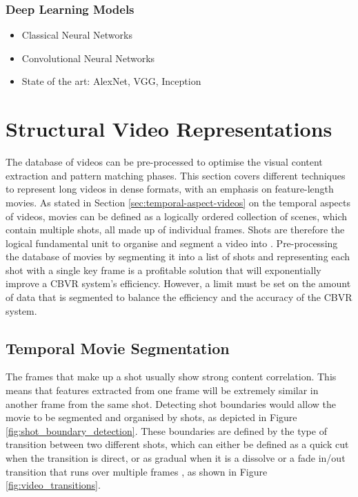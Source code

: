 \subsubsection{Deep Learning Models}

\begin{itemize}
    \item Classical Neural Networks
    \item Convolutional Neural Networks
    \item State of the art: AlexNet, VGG, Inception
\end{itemize}


\section{Structural Video Representations}
\label{sec:movie-pre-processing}

The database of videos can be pre-processed to optimise the visual content extraction and pattern matching phases. This section covers different techniques to represent long videos in dense formats, with an emphasis on feature-length movies. As stated in Section \ref{sec:temporal-aspect-videos} on the temporal aspects of videos, movies can be defined as a logically ordered collection of scenes, which contain multiple shots, all made up of individual frames. Shots are therefore the logical fundamental unit to organise and segment a video into \cite{hu2011survey}. Pre-processing the database of movies by segmenting it into a list of shots and representing each shot with a single key frame is a profitable solution that will exponentially improve a CBVR system's efficiency. However, a limit must be set on the amount of data that is segmented to balance the efficiency and the accuracy of the CBVR system.


\subsection{Temporal Movie Segmentation}

The frames that make up a shot usually show strong content correlation. This means that features extracted from one frame will be extremely similar in another frame from the same shot. Detecting shot boundaries would allow the movie to be segmented and organised by shots, as depicted in Figure \ref{fig:shot_boundary_detection}. These boundaries are defined by the type of transition between two different shots, which can either be defined as a quick cut when the transition is direct, or as gradual when it is a dissolve or a fade in/out transition that runs over multiple frames \cite{yuan2007shotboundary}, as shown in Figure \ref{fig:video_transitions}.

